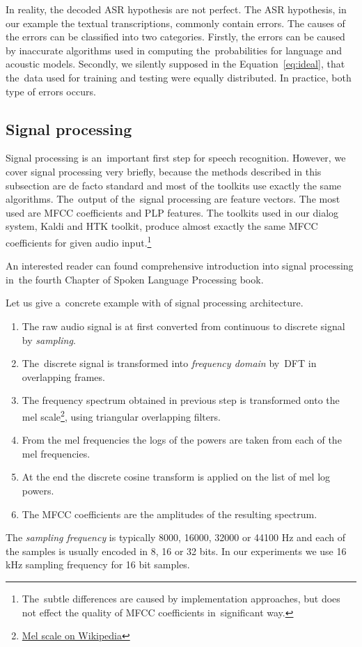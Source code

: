 In reality, the decoded ASR hypothesis are not perfect. The ASR hypothesis, in our example the textual transcriptions, 
commonly contain errors. The causes of the errors can be classified into two categories. 
Firstly, the errors can be caused by inaccurate algorithms used in computing 
the~probabilities for language and acoustic models. Secondly, we silently supposed in the Equation~\ref{eq:ideal}, 
that the~data used for training and testing were equally distributed. 
In practice, both type of errors occurs.

\subsection{Signal processing}
\label{sub:signal}
Signal processing is an~important first step for speech recognition. However, we cover signal processing very briefly, because the methods described in this subsection are de facto standard and most of the toolkits use exactly the same algorithms. The~output of the~signal processing are feature vectors. The most used are \ac{MFCC} coefficients and \ac{PLP} features. The toolkits used in our dialog system, Kaldi and \ac{HTK} toolkit, produce almost exactly the same \ac{MFCC} coefficients for given audio input.\footnote{The~subtle differences are caused by implementation approaches, but does not effect the quality of \ac{MFCC} coefficients in~significant way.}

An interested reader can found comprehensive introduction into signal processing in~the fourth Chapter of Spoken Language Processing book\cite{huang2001spoken}.

Let us give a~concrete example with of signal processing architecture. 
\begin{enumerate}
    \item The raw audio signal is at first converted from continuous to discrete signal by {\it sampling}.  %
    \item The~discrete signal is transformed into {\it frequency domain}\/ by~\ac{DFT} in overlapping frames.
    \item The frequency spectrum obtained in previous step is transformed onto the mel scale\footnote{\href{https://en.wikipedia.org/wiki/Mel_scale}{Mel scale on Wikipedia}}, using triangular overlapping filters.
    \item From the mel frequencies the logs of the powers are taken from each of the mel frequencies.
    \item At the end the discrete cosine transform is applied on the list of mel log powers.
    \item The \ac{MFCC} coefficients are the amplitudes of the resulting spectrum.
\end{enumerate}
The {\it sampling frequency}\/ is typically 8000, 16000, 32000 or 44100 Hz and each of the samples is usually encoded in 8, 16 or 32 bits. In our experiments we use 16 kHz sampling frequency for 16 bit samples.  

